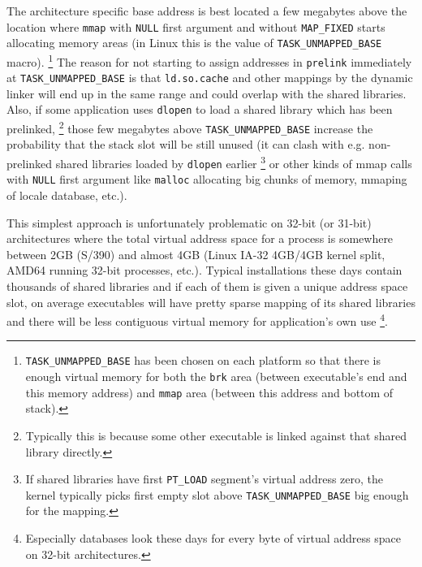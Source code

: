 \documentclass[twoside]{article}
\def\tts#1{\texttt{\small #1}}
\begin{document}
The architecture specific base address is best located a few megabytes above
the location where \tts{mmap} with \tts{NULL} first argument and without
\tts{MAP\_FIXED} starts allocating memory areas (in Linux this is the value
of \tts{TASK\_UNMAPPED\_BASE} macro).
\footnote{\tts{TASK\_UNMAPPED\_BASE} has been chosen
on each platform so that there is enough virtual memory for both the
\tts{brk} area (between executable's end and this memory address) and \tts{mmap}
area (between this address and bottom of stack).}  The reason for not
starting to assign addresses in \tts{prelink} immediately at
\tts{TASK\_UNMAPPED\_BASE} is that \tts{ld.so.cache} and other mappings by
the dynamic linker will end up in the same range and could overlap with
the shared libraries.  Also, if some application uses \tts{dlopen} to load
a shared library which has been prelinked,
\footnote{Typically this is because some other executable is linked against that
shared library directly.}
those few megabytes above \tts{TASK\_UNMAPPED\_BASE} increase the probability
that the stack slot will be still unused (it can clash with e.g.
non-prelinked shared libraries loaded by \tts{dlopen} earlier
\footnote{If shared libraries have first \tts{PT\_LOAD} segment's virtual
address zero, the kernel typically picks first empty slot above
\tts{TASK\_UNMAPPED\_BASE} big enough for the mapping.} or other kinds
of mmap calls with \tts{NULL} first argument like \tts{malloc} allocating
big chunks of memory, mmaping of locale database, etc.).

This simplest approach is unfortunately problematic on 32-bit (or 31-bit)
architectures where the total virtual address space for a process is
somewhere between 2GB (S/390) and almost 4GB (Linux IA-32 4GB/4GB kernel
split, AMD64 running 32-bit processes, etc.).  Typical installations these
days contain thousands of shared libraries and if each of them is given a
unique address space slot, on average executables will have pretty sparse
mapping of its shared libraries and there will be less contiguous virtual
memory for application's own use
\footnote{Especially databases look these days for every byte of virtual
address space on 32-bit architectures.}.
\end{document}
